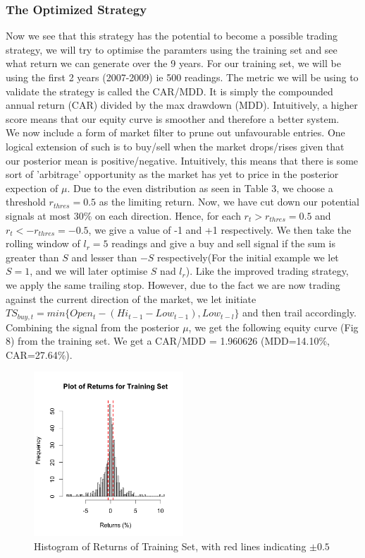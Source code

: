 \documentclass[12pt]{article}
\theoremstyle{definition}
\begin{document}
\subsubsection{The Optimized Strategy}
Now we see that this strategy has the potential to become a possible trading strategy, we will try to optimise the paramters using the training set and see what return we can generate over the 9 years. For our training set, we will be using the first 2 years (2007-2009) ie 500 readings. The metric we will be using to validate the strategy is called the CAR/MDD. It is simply the compounded annual return (CAR) divided by the max drawdown (MDD). Intuitively, a higher score means that our equity curve is smoother and therefore a better system.\\
We now include a form of market filter to prune out unfavourable entries. One logical extension of such is to buy/sell when the market drops/rises given that our posterior mean is positive/negative. Intuitively, this means that there is some sort of 'arbitrage' opportunity as the market has yet to price in the posterior expection of $\mu$. Due to the even distribution as seen in Table 3, we choose a threshold $r_{thres}=0.5$ as the limiting return. Now, we have cut down our potential signals at most 30\% on each direction. Hence, for each $r_{t}>r_{thres}=0.5$ and $r_{t}<-r_{thres}=-0.5$, we give a value of -1 and +1 respectively. We then take the rolling window of $l_{r}=5$ readings and give a buy and sell signal if the sum is greater than $S$ and lesser than $-S$ respectively(For the initial example we let $S=1$, and we will later optimise $S$ nad $l_{r}$). Like the improved trading strategy, we apply the same trailing stop. However, due to the fact we are now trading against the current direction of the market, we let initiate $TS_{buy,t} = min\{Open_{t}-(Hi_{t-1}-Low_{t-1}),Low_{t-l}\}$ and then trail accordingly. Combining the signal from the posterior $\mu$, we get the following equity curve (Fig 8) from the training set. We get a CAR/MDD = 1.960626 (MDD=14.10\%, CAR=27.64\%).
\begin{figure}
\centering
\includegraphics[width=0.5\textwidth]{returns}
\caption{Histogram of Returns of Training Set, with red lines indicating $\pm 0.5$}
\end{figure}
\end{document}
